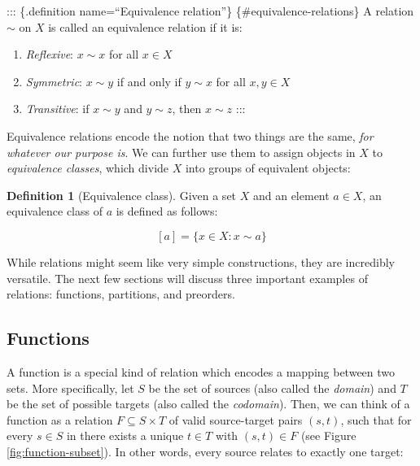 \documentclass[
]{book}
\providecommand{\tightlist}{%
  \setlength{\itemsep}{0pt}\setlength{\parskip}{0pt}}
\theoremstyle{definition}
\newtheorem{definition}{Definition}[chapter]
\theoremstyle{definition}
\theoremstyle{definition}
\theoremstyle{definition}
\theoremstyle{remark}
\begin{document}
::: \{.definition name=``Equivalence relation''\} \{\#equivalence-relations\}
A relation \(\sim\) on \(X\) is called an equivalence relation if it is:

\begin{enumerate}
\def\labelenumi{\arabic{enumi}.}
\tightlist
\item
  \emph{Reflexive}: \(x \sim x\) for all \(x \in X\)
\item
  \emph{Symmetric}: \(x \sim y\) if and only if \(y \sim x\) for all \(x, y \in X\)
\item
  \emph{Transitive}: if \(x \sim y\) and \(y \sim z\), then \(x \sim z\)
  :::
\end{enumerate}

Equivalence relations encode the notion that two things are the same, \emph{for whatever our purpose is}. We can further use them to assign objects in \(X\) to \emph{equivalence classes}, which divide \(X\) into groups of equivalent objects:

\begin{definition}[Equivalence class]
Given a set \(X\) and an element \(a \in X\), an equivalence class of \(a\) is defined as follows:

\[[a] = \{ x \in X : x \sim a \}\]
\end{definition}

While relations might seem like very simple constructions, they are incredibly versatile. The next few sections will discuss three important examples of relations: functions, partitions, and preorders.

\subsection{Functions}\label{functions}

A function is a special kind of relation which encodes a mapping between two sets. More specifically, let \(S\) be the set of sources (also called the \emph{domain}) and \(T\) be the set of possible targets (also called the \emph{codomain}). Then, we can think of a function as a relation \(F \subseteq S \times T\) of valid source-target pairs \((s, t)\), such that for every \(s \in S\) in there exists a unique \(t \in T\) with \((s, t) \in F\) (see Figure \ref{fig:function-subset}). In other words, every source relates to exactly one target:
\end{document}
